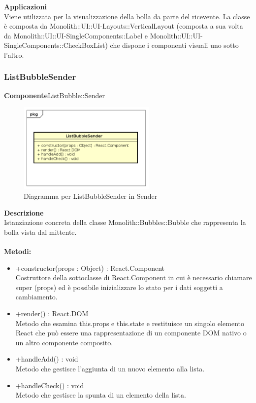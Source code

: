 \textbf{Applicazioni}\\
Viene utilizzata per la visualizzazione della bolla da parte del ricevente.
La classe è composta da Monolith::UI::UI-Layouts::VerticalLayout (composta a sua volta da Monolith::UI::UI-SingleComponents::Label e Monolith::UI::UI-SingleComponents::CheckBoxList) che dispone i componenti visuali uno sotto l'altro. 


\clearpage

\subsubsection{ListBubbleSender}
\textbf{Componente}ListBubble::Sender\\
   \FloatBarrier
   \begin{figure}[ht]
   \centering
   \includegraphics[width=0.6\textwidth]{img/single-ListBubbleSender}
   \caption{{Diagramma per ListBubbleSender in Sender}}
\end{figure}
\FloatBarrier
\textbf{Descrizione}\\
Istanziazione concreta della classe Monolith::Bubbles::Bubble che rappresenta la bolla vista dal mittente.
\\
\\
\textbf{Metodi:} 
\begin{itemize}
\item +constructor(props : Object) : React.Component 
\\
Costruttore della sottoclasse di React.Component in cui è necessario chiamare super (props) ed è possibile inizializzare lo stato per i dati soggetti a cambiamento.

\item +render() : React.DOM 
\\
Metodo che esamina this.props e this.state e restituisce un singolo elemento React che può essere una rappresentazione di un componente DOM nativo o un altro componente composito.

\item +handleAdd() : void 
\\
Metodo che gestisce l'aggiunta di un nuovo elemento alla lista.
\item +handleCheck() : void 
\\
Metodo che gestisce la spunta di un elemento della lista.
\end{itemize} 


